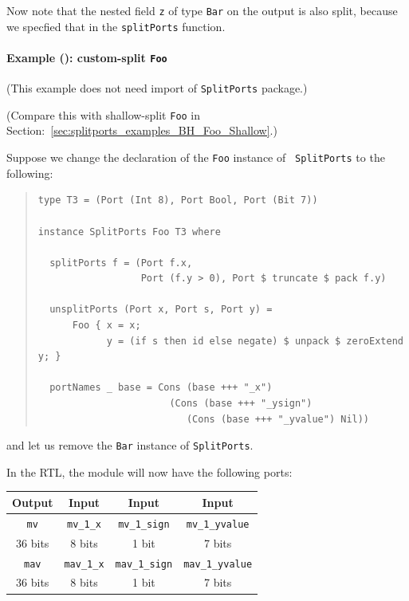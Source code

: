 Now note that the nested field {\tt z} of type {\tt Bar} on the output
is also split, because we specfied that in the {\tt splitPorts}
function.


\paragraph{Example (\BH): custom-split {\tt Foo}}

\label{sec:splitports_examples_BH_Custom}

\hspace*{1em}

{\footnotesize (This example does not need import of {\tt SplitPorts} package.)}

(Compare this with shallow-split {\tt Foo} in
Section:~\ref{sec:splitports_examples_BH_Foo_Shallow}.)

Suppose we change the declaration of the {\tt Foo} instance of {\tt
SplitPorts} to the following:

\begin{quote}
\begin{verbatim}
type T3 = (Port (Int 8), Port Bool, Port (Bit 7))

instance SplitPorts Foo T3 where

  splitPorts f = (Port f.x,
                  Port (f.y > 0), Port $ truncate $ pack f.y)

  unsplitPorts (Port x, Port s, Port y) =
      Foo { x = x;
            y = (if s then id else negate) $ unpack $ zeroExtend y; }

  portNames _ base = Cons (base +++ "_x")
                       (Cons (base +++ "_ysign")
                          (Cons (base +++ "_yvalue") Nil))
\end{verbatim}
\end{quote}

and let us remove the {\tt Bar} instance of {\tt SplitPorts}.

In the RTL, the module will now have the following ports:

\begin{center}
  \begin{tabular}{|c||c|c|c|}
    \hline
     Output &
     Input  &
     Input  &
     Input  \\
    \hline
     {\tt mv}            &
     {\tt mv\_1\_x}      &
     {\tt mv\_1\_sign}   &
     {\tt mv\_1\_yvalue} \\
     36 bits &
      8 bits &
      1 bit  &
      7 bits \\
    \hline
     {\tt mav}            &
     {\tt mav\_1\_x}      &
     {\tt mav\_1\_sign}   &
     {\tt mav\_1\_yvalue} \\
     36 bits &
      8 bits &
      1 bit  &
      7 bits \\
    \hline
  \end{tabular}
\end{center}

